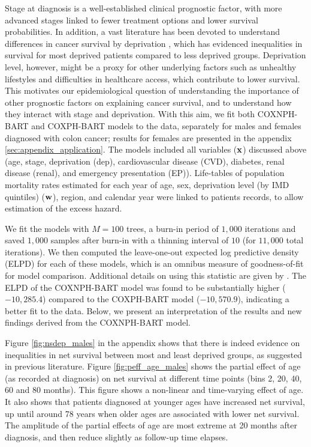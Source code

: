 \documentclass[12pt]{article}
\newcommand{\bfx}{{\bf x}}
\newcommand{\bfw}{{\bf w}}
\begin{document}
Stage at diagnosis is a well-established clinical prognostic factor, with more advanced stages linked to fewer treatment options and lower survival probabilities. In addition, a vast literature has been devoted to understand differences in cancer survival by deprivation \citep{woods:2006}, which has evidenced inequalities in survival for most deprived patients compared to less deprived groups. Deprivation level, however, might be a proxy for other underlying factors such as unhealthy lifestyles and difficulties in healthcare access, which contribute to lower survival. This motivates our epidemiological question of understanding the importance of other prognostic factors on explaining cancer survival, and to understand how they interact with stage and deprivation. With this aim, we fit both COXNPH-BART and COXPH-BART models to the data, separately for males and females diagnosed with colon cancer; results for females are presented in the appendix \ref{sec:appendix_application}. The models included all variables ($\bfx$) discussed above (age, stage, deprivation (dep), cardiovascular disease (CVD), diabetes, renal disease (renal), and emergency presentation (EP)). Life-tables of population mortality rates estimated for each year of age, sex, deprivation level (by IMD quintiles) ($\bfw$), region, and calendar year were linked to patients records, to allow estimation of the excess hazard. 

We fit the models with $M = 100$ trees, a burn-in period of $1,000$ iterations and saved $1,000$ samples after burn-in with a thinning interval of $10$ (for $11,000$ total iterations). We then computed the leave-one-out expected log predictive density (ELPD) for each of these models, which is an omnibus measure of goodness-of-fit for model comparison. Additional details on using this statistic are given by \cite{vehtari2017practical}. The ELPD of the COXNPH-BART model was found to be substantially higher ($-10,285.4$) compared to the COXPH-BART model ($-10,570.9$), indicating a better fit to the data. Below, we present an interpretation of the results and new findings derived from the COXNPH-BART model.

Figure \ref{fig:nsdep_males} in the appendix shows that there is indeed evidence on inequalities in net survival between most and least deprived groups, as suggested in previous literature. Figure \ref{fig:peff_age_males} shows the partial effect of age (as recorded at diagnosis) on net survival at different time points (bins 2, 20, 40, 60 and 80 months). This figure shows a non-linear and time-varying effect of age. It also shows that patients diagnosed at younger ages have increased net survival, up until around 78 years when older ages are associated with lower net survival. The amplitude of the partial effects of age are most extreme at 20 months after diagnosis, and then reduce slightly as follow-up time elapses.
\end{document}
